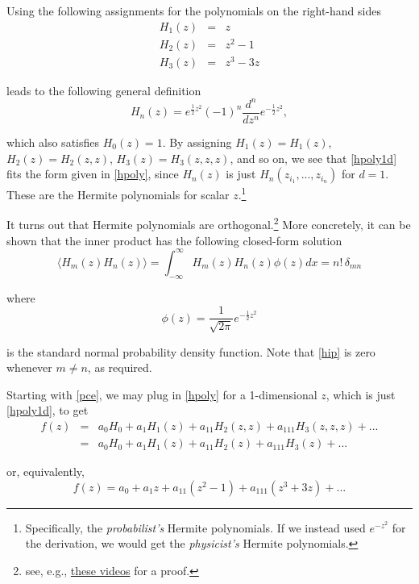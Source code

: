 \documentclass[11pt]{article}
\numberwithin{equation}{section}
\begin{document}
Using the following assignments for the polynomials on the right-hand sides
\begin{eqnarray*}
H_1(z) & = & z \\
H_2(z) & = & z^2 - 1 \\
H_3(z) & = & z^3 - 3 z
\end{eqnarray*}

leads to the following general definition
\begin{equation}
H_n(z) = e^{\frac{1}{2} z^2} (-1)^n \frac{d^n}{dz^n} e^{-\frac{1}{2} z^2}, \label{hpoly1d}
\end{equation}

which also satisfies $H_0(z) = 1$. By assigning $H_1(z) = H_1(z)$, $H_2(z) = H_2(z, z)$, $H_3(z) = H_3(z, z, z)$, and so on, we see that \eqref{hpoly1d} fits the form given in \eqref{hpoly}, since $H_n(z)$ is just $H_n (z_{i_1}, ..., z_{i_n})$ for $d = 1$. These are the Hermite polynomials for scalar $z$.\footnote{Specifically, the {\em probabilist's} Hermite polynomials. If we instead used $e^{-z^2}$ for the derivation, we would get the {\em physicist's} Hermite polynomials.}

\qquad It turns out that Hermite polynomials are orthogonal.\footnote{see, e.g., \href{https://www.youtube.com/playlist?list=PL2uXHjNuf12byaQWF2IU7i7h8D70-d8MW}{these videos} for a proof.} More concretely, it can be shown that the inner product has the following closed-form solution
\begin{equation}
\langle H_m(z) H_n(z) \rangle = \int_{-\infty}^{\infty} H_m(z) H_n(z) \phi(z) dx =  n! \, \delta_{mn} \label{hip}
\end{equation}

where
\begin{equation*}
\phi(z) = \frac{1}{\sqrt{2 \pi}}e^{-\frac{1}{2} z^2}
\end{equation*}

is the standard normal probability density function. Note that \eqref{hip} is zero whenever $m \neq n$, as required.

\qquad Starting with \eqref{pce}, we may plug in \eqref{hpoly} for a 1-dimensional $z$, which is just \eqref{hpoly1d}, to get 
\begin{eqnarray}
f(z) & = & a_0 H_0 + a_1 H_1(z)  + a_{11} H_2(z, z) + a_{111} H_3(z, z, z) + ... \nonumber \\
& = & a_0 H_0 + a_1 H_1(z)  + a_{11} H_2(z) + a_{111} H_3(z) + ...
\end{eqnarray}

or, equivalently,
\begin{equation}
f(z) = a_0 +  a_1 z + a_{11} (z^2 - 1) + a_{111} (z^3 + 3 z) + ...
\end{equation}
\end{document}
